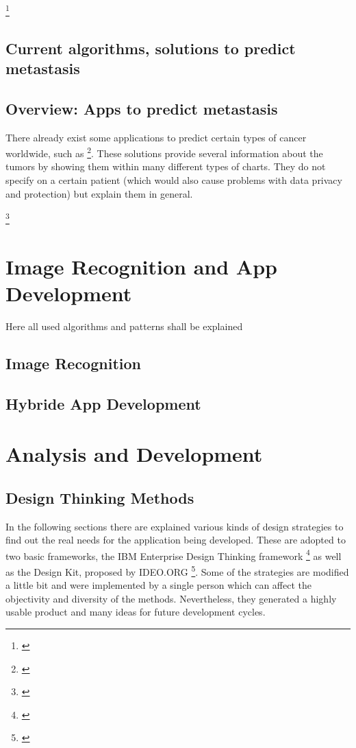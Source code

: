 \footnote{\cite{ham10000}}

\section{Current algorithms, solutions to predict metastasis}

\section{Overview: Apps to predict metastasis}

There already exist some applications to predict certain types of cancer worldwide, such as \footnote{\cite{iarc_predict_cancer_worldwide}}. These solutions provide several information about the tumors by showing them within many different types of charts. They do not specify on a certain patient (which would also cause problems with data privacy and protection) but explain them in general.  


\footnote{\cite{vijini_gen_alg}}


\chapter{Image Recognition and App Development}
Here all used algorithms and patterns shall be explained

\section{Image Recognition}
\section{Hybride App Development}


\chapter{Analysis and Development}

\section{Design Thinking Methods}

In the following sections there are explained various kinds of design strategies to find out the real needs for the application being developed. These are adopted to two basic frameworks, the IBM Enterprise Design Thinking framework \footnote{\cite{ibm_edt}} as well as the Design Kit, proposed by IDEO.ORG \footnote{\cite{design_kit}}. Some of the strategies are modified a little bit and were implemented by a single person which can affect the objectivity and diversity of the methods. Nevertheless, they generated a highly usable product and many ideas for future development cycles. 


